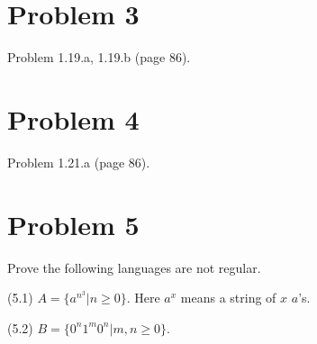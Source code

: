 \documentclass[11pt]{article}
\begin{document}
\newpage
\section*{Problem 3}

Problem 1.19.a, 1.19.b (page 86).
\newline


\newpage
\section*{Problem 4}

Problem 1.21.a (page 86).
\newline


\newpage
\section*{Problem 5}

Prove the following languages are not regular.

(5.1) $A=\{a^{n^3}|n\geq 0\}$. Here $a^x$ means a string of $x$ $a$'s.
\newline

(5.2) $B=\{0^n1^m0^n|m,n\geq 0\}$.
\newline
\end{document}
